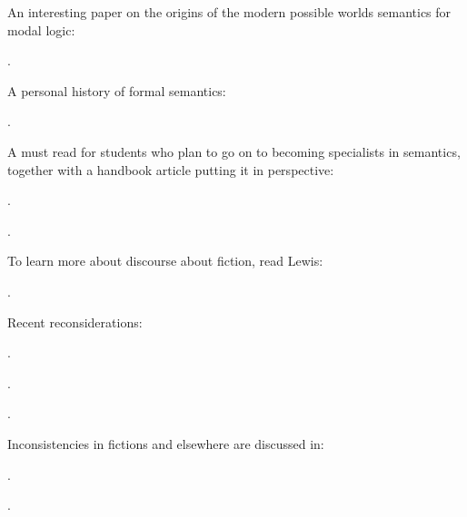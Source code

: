{An interesting paper on the origins of the modern possible worlds
semantics for modal logic:
\begin{bibentrylist}
	\item {}.
\end{bibentrylist}

A personal history of formal semantics:
\begin{bibentrylist}
	\item {}.
\end{bibentrylist}

A must read for students who plan to go on to becoming specialists in
semantics, together with a handbook article putting it in perspective:
\begin{bibentrylist}
	\item {}. 
	\item {}. 
\end{bibentrylist}

To learn more about discourse about fiction, read Lewis:
\begin{bibentrylist}
	\item {}. 
\end{bibentrylist}

Recent reconsiderations:
\begin{bibentrylist}
	\item {}. 
	\item {}.
  \item {}.
\end{bibentrylist}

  

Inconsistencies in fictions and elsewhere are discussed in:
\begin{bibentrylist}
	\item {}. 
	\item {}. 
\end{bibentrylist}

}
